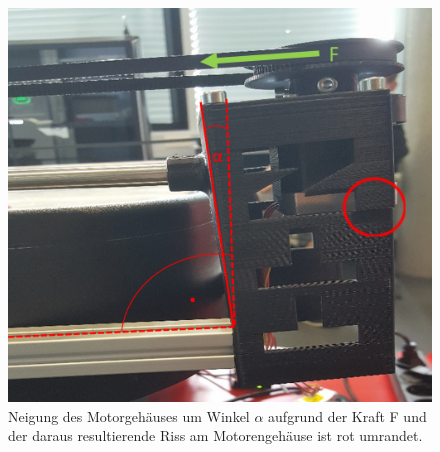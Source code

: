 \begin{figure} [h]

\begin{minipage}[t]{0.6\textwidth}
\vspace{0pt}
\includegraphics[width=\textwidth]{images/HW_Motorgehaeuse}
\caption{Neigung des Motorgehäuses um Winkel $\alpha$ aufgrund der Kraft F und der daraus resultierende Riss am Motorengehäuse ist rot umrandet.\\}
\label{HW_Motorgehaeuse}
\end{minipage}
\end{figure}

\clearpage




